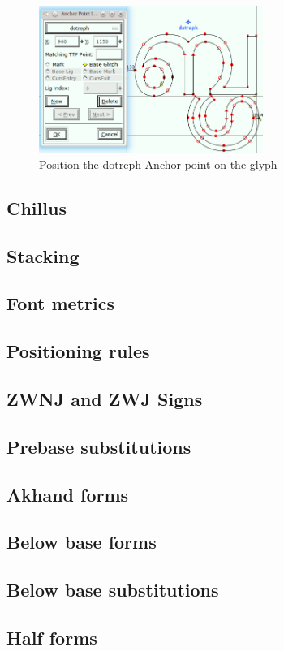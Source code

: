 \begin{figure}[H]
  \includegraphics[width=0.65\textwidth]{images/malayalam-meera-conjunct-add-anchor-2.png}
  \caption{Position the dotreph Anchor point on the glyph}
\end{figure}

\subsection {Chillus}
\subsection {Stacking}
\subsection {Font metrics}
\subsection {Positioning rules}
\subsection {ZWNJ and ZWJ Signs}
\subsection {Prebase substitutions}
\subsection {Akhand forms}
\subsection {Below base forms}
\subsection {Below base substitutions}
\subsection {Half forms}
